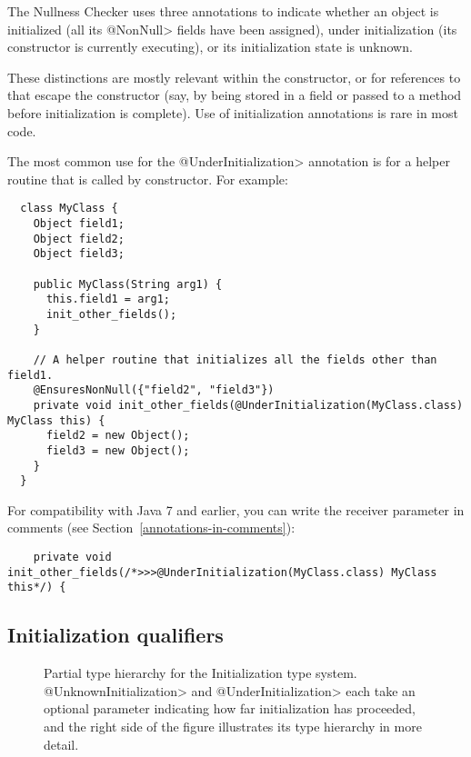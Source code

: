 The Nullness Checker uses three annotations to indicate whether an object
is initialized (all its \<@NonNull> fields have been assigned), under
initialization (its constructor is currently executing), or its
initialization state is unknown.

These distinctions are mostly relevant within the constructor, or for
references to  that escape the constructor (say, by being stored
in a field or passed to a method before initialization is complete).  
Use of initialization annotations is rare in most code.

The most common use for the \<@UnderInitialization> annotation is for a
helper routine that is called by constructor.  For example:

\begin{Verbatim}
  class MyClass {
    Object field1;
    Object field2;
    Object field3;

    public MyClass(String arg1) {
      this.field1 = arg1;
      init_other_fields();
    }

    // A helper routine that initializes all the fields other than field1.
    @EnsuresNonNull({"field2", "field3"})
    private void init_other_fields(@UnderInitialization(MyClass.class) MyClass this) {
      field2 = new Object();
      field3 = new Object();
    }
  }
\end{Verbatim}

For compatibility with Java 7 and earlier, you can write the receiver
parameter in comments (see Section~\ref{annotations-in-comments}):
\begin{Verbatim}
    private void init_other_fields(/*>>>@UnderInitialization(MyClass.class) MyClass this*/) {
\end{Verbatim}


\subsection{Initialization qualifiers\label{initialization-qualifiers}}

\begin{figure}
\caption{Partial type hierarchy for the Initialization type system.
  \<@UnknownInitialization> and \<@UnderInitialization> each take an
  optional parameter indicating how far initialization has proceeded, and
  the right side of the figure illustrates its type hierarchy in more detail.}
\label{fig-initialization-hierarchy}
\end{figure}

